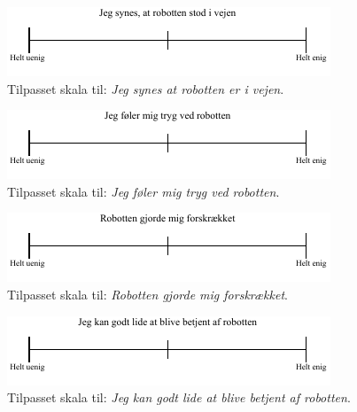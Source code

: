 \noindent
% 
%
\begin{figure}[H]
\centering
\includegraphics[width =\textwidth]{Figure/TilpasningAfSkalaer/TilpassetRobottenErIVejen} 
\caption{Tilpasset skala til: \textit{Jeg synes at robotten er i vejen}.}
\label{fig:TilpasningRobottenErIVejen}
\end{figure}
\noindent
% 
%
\begin{figure}[H]
\centering
\includegraphics[width =\textwidth]{Figure/TilpasningAfSkalaer/TilpassetTrygVedR} 
\caption{Tilpasset skala til: \textit{Jeg føler mig tryg ved robotten}.}
\label{fig:TilpasningTrygVedR}
\end{figure}
\noindent
% 
%
\begin{figure}[H]
\centering
\includegraphics[width =\textwidth]{Figure/TilpasningAfSkalaer/TilpassetForskraekket} 
\caption{Tilpasset skala til: \textit{Robotten gjorde mig forskrækket}.}
\label{fig:TilpasningForskraekket}
\end{figure}
\noindent
% 
%
\begin{figure}[H]
\centering
\includegraphics[width =\textwidth]{Figure/TilpasningAfSkalaer/TilpassetLideBetjening} 
\caption{Tilpasset skala til: \textit{Jeg kan godt lide at blive betjent af robotten}.}
\label{fig:TilpasningLideBetjening}
\end{figure}

